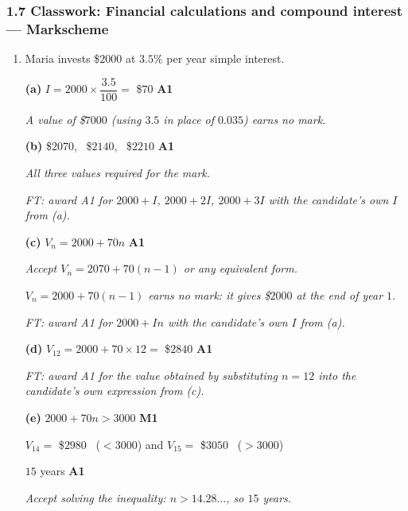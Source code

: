 \documentclass[12pt, twoside]{article}
\begin{document}
\subsubsection*{1.7 Classwork: Financial calculations and compound interest --- Markscheme}

\begin{enumerate}[itemsep=0.3cm]

\item[1.] [Maximum mark: 6]

Maria invests \$$2000$ at $3.5\%$ per year simple interest.

\medskip

\textbf{(a)} $I = 2000 \times \dfrac{3.5}{100} = $ \$$70$ \hfill \textbf{A1}

\emph{A value of \$$7000$ (using $3.5$ in place of $0.035$) earns no
mark.}

\medskip

\textbf{(b)} \$$2070$, \ \$$2140$, \ \$$2210$ \hfill \textbf{A1}

\emph{All three values required for the mark.}

\emph{FT: award A1 for $2000 + I$, $2000 + 2I$, $2000 + 3I$ with the
candidate's own $I$ from (a).}

\medskip

\textbf{(c)} $V_{n} = 2000 + 70n$ \hfill \textbf{A1}

\emph{Accept $V_{n} = 2070 + 70(n - 1)$ or any equivalent form.}

\emph{$V_{n} = 2000 + 70(n - 1)$ earns no mark: it gives \$$2000$ at
the end of year $1$.}

\emph{FT: award A1 for $2000 + In$ with the candidate's own $I$ from
(a).}

\medskip

\textbf{(d)} $V_{12} = 2000 + 70 \times 12 = $ \$$2840$ \hfill \textbf{A1}

\emph{FT: award A1 for the value obtained by substituting $n = 12$
into the candidate's own expression from (c).}

\medskip

\textbf{(e)} $2000 + 70n > 3000$ \hfill \textbf{M1}

$V_{14} = $ \$$2980$ \ ($< 3000$) \quad and \quad $V_{15} = $ \$$3050$
\ ($> 3000$)

$15$ years \hfill \textbf{A1}

\emph{Accept solving the inequality: $n > 14.28\ldots$, so $15$
years.}


\end{enumerate}
\end{document}

